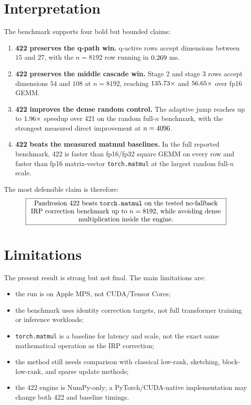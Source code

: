 \documentclass[11pt]{article}
\newcommand{\matmul}{\texttt{torch.matmul}}
\begin{document}
\section{Interpretation}

The benchmark supports four bold but bounded claims:

\begin{enumerate}[leftmargin=1.4em]
\item \textbf{422 preserves the q-path win.}  q-active rows accept dimensions
between \(15\) and \(27\), with the \(n=8192\) row running in
\(0.269\) ms.
\item \textbf{422 preserves the middle cascade win.}  Stage 2 and stage 3 rows
accept dimensions \(54\) and \(108\) at \(n=8192\), reaching
\(135.73\times\) and \(56.65\times\) over
fp16 GEMM.
\item \textbf{422 improves the dense random control.}  The adaptive jump reaches
up to \(1.96\times\) speedup over 421 on the random full-\(n\)
benchmark, with the strongest measured direct improvement at \(n=4096\).
\item \textbf{422 beats the measured matmul baselines.}  In the full reported
benchmark, 422 is faster than fp16/fp32 square GEMM on every row and faster
than fp16 matrix-vector \matmul{} at the largest random full-\(n\) scale.
\end{enumerate}

The most defensible claim is therefore:
\[
\boxed{
\begin{minipage}{0.84\linewidth}
\centering
Pandrosion 422 beats \matmul{} on the tested no-fallback IRP correction
benchmark up to \(n=8192\), while avoiding dense multiplication inside the
engine.
\end{minipage}}
\]

\section{Limitations}

The present result is strong but not final.  The main limitations are:
\begin{itemize}[leftmargin=1.25em]
\item the run is on Apple MPS, not CUDA/Tensor Cores;
\item the benchmark uses identity correction targets, not full transformer
training or inference workloads;
\item \matmul{} is a baseline for latency and scale, not the exact same
mathematical operation as the IRP correction;
\item the method still needs comparison with classical low-rank, sketching,
block-low-rank, and sparse update methods;
\item the 422 engine is NumPy-only; a PyTorch/CUDA-native implementation may
change both 422 and baseline timings.
\end{itemize}
\end{document}
